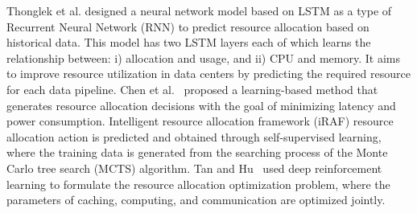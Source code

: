         Thonglek et al. \cite{thonglekImprovingResourceUtilization2019} designed a neural network model based on LSTM as a type of Recurrent Neural Network (RNN) to predict resource allocation based on historical data. This model has two LSTM layers each of which learns the relationship between: i) allocation and usage, and ii) CPU and memory. It aims to improve resource utilization in data centers by predicting the required resource for each data pipeline.
        Chen et al.~\cite{chenIRAFDeepReinforcement2019,chenIntelligentTaskOffloading2020} proposed a learning-based method that generates resource allocation decisions with the goal of minimizing latency and power consumption. Intelligent resource allocation framework (iRAF) resource allocation action is predicted and obtained through self-supervised learning, where the training data is generated from the searching process of the Monte Carlo tree search (MCTS) algorithm.
        Tan and Hu~\cite{huMobilityawareEdgeCaching2018} used deep reinforcement learning to formulate the resource allocation optimization problem, where the parameters of caching, computing, and communication are optimized jointly.


    


            